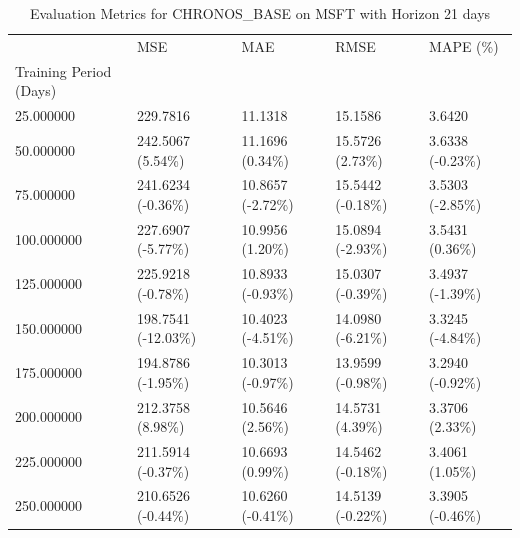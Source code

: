 \begin{table}
\caption{Evaluation Metrics for CHRONOS_BASE on MSFT with Horizon 21 days}
\label{tab:chronos_base_MSFT_h21_metrics}
\begin{tabular}{lllll}
\toprule
 & MSE & MAE & RMSE & MAPE (\%) \\
Training Period (Days) &  &  &  &  \\
\midrule
25.000000 & 229.7816 & 11.1318 & 15.1586 & 3.6420 \\
50.000000 & 242.5067 (5.54\%) & 11.1696 (0.34\%) & 15.5726 (2.73\%) & 3.6338 (-0.23\%) \\
75.000000 & 241.6234 (-0.36\%) & 10.8657 (-2.72\%) & 15.5442 (-0.18\%) & 3.5303 (-2.85\%) \\
100.000000 & 227.6907 (-5.77\%) & 10.9956 (1.20\%) & 15.0894 (-2.93\%) & 3.5431 (0.36\%) \\
125.000000 & 225.9218 (-0.78\%) & 10.8933 (-0.93\%) & 15.0307 (-0.39\%) & 3.4937 (-1.39\%) \\
150.000000 & 198.7541 (-12.03\%) & 10.4023 (-4.51\%) & 14.0980 (-6.21\%) & 3.3245 (-4.84\%) \\
175.000000 & 194.8786 (-1.95\%) & 10.3013 (-0.97\%) & 13.9599 (-0.98\%) & 3.2940 (-0.92\%) \\
200.000000 & 212.3758 (8.98\%) & 10.5646 (2.56\%) & 14.5731 (4.39\%) & 3.3706 (2.33\%) \\
225.000000 & 211.5914 (-0.37\%) & 10.6693 (0.99\%) & 14.5462 (-0.18\%) & 3.4061 (1.05\%) \\
250.000000 & 210.6526 (-0.44\%) & 10.6260 (-0.41\%) & 14.5139 (-0.22\%) & 3.3905 (-0.46\%) \\
\bottomrule
\end{tabular}
\end{table}

